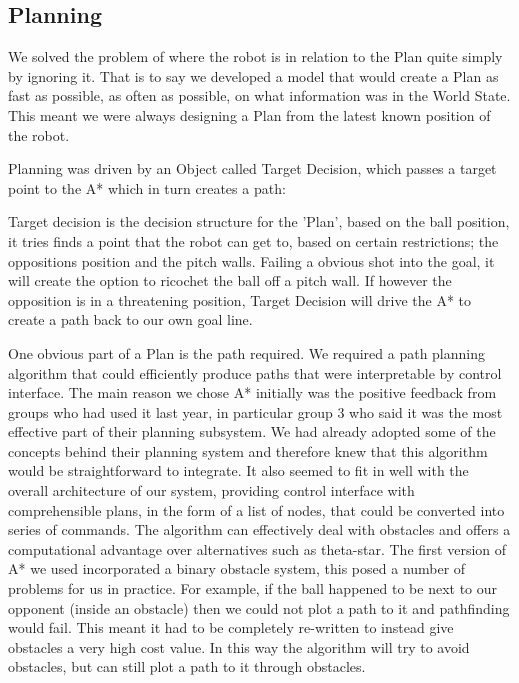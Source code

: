 \subsection{Planning}



We solved the problem of where the robot is in relation to the Plan quite simply
by ignoring it. That is to say we developed a model that would create a Plan
as fast as possible, as often as possible, on what information was in the World
State. This meant we were always designing a Plan from the latest known position 
of the robot.

Planning was driven by an Object called Target Decision, which passes a target
point to the A* which in turn creates a path:


Target decision is the decision structure for the 'Plan', based on the ball 
position, it tries finds a point that the robot can get to, based on certain 
restrictions; the oppositions position and the pitch walls. Failing a obvious
shot into the goal, it will create the option to ricochet the ball off a pitch
wall. If however the opposition is in a threatening position, Target Decision
will drive the A* to create a path back to our own goal line.


One obvious part of a Plan is the path required. We required a path planning 
algorithm that could efficiently produce paths that were interpretable by 
control interface. The main reason we chose A* initially was the positive 
feedback from groups who had used it last year, in particular group 3 who said 
it was the most effective part of their planning subsystem. We had already 
adopted some of the concepts behind their planning system and therefore knew 
that this algorithm would be straightforward to integrate. It also seemed to 
fit in well with the overall architecture of our system, providing control 
interface with comprehensible plans, in the form of a list of nodes, that could 
be converted into series of commands. The algorithm can effectively deal with 
obstacles and offers a computational advantage over alternatives such as theta-star. 
The first version of A* we used incorporated a binary obstacle system, this posed 
a number of problems for us in practice. For example, if the ball happened to be 
next to our opponent (inside an obstacle) then we could not plot a path to it and 
pathfinding would fail. This meant it had to be completely re-written to instead 
give obstacles a very high cost value. In this way the algorithm will try to avoid 
obstacles, but can still plot a path to it through obstacles.

